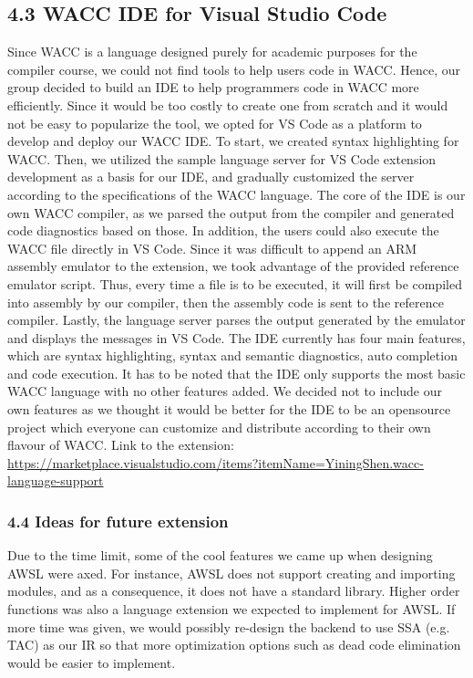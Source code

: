 \documentclass[10pt,a4paper]{report}
\begin{document}
  \subsection*{4.3 WACC IDE for Visual Studio Code}
  Since WACC is a language designed purely for academic purposes for the compiler course, we could not find tools to help users code in WACC. Hence, 
  our group decided to build an IDE to help programmers code in WACC more efficiently. Since it would be too costly to create one from scratch and 
  it would not be easy to popularize the tool, we opted for VS Code as a platform to develop and deploy our WACC IDE. To start, we created syntax 
  highlighting for WACC. Then, we utilized the sample language server for VS Code extension development as a basis for our IDE, and gradually customized 
  the server according to the specifications of the WACC language. The core of the IDE is our own WACC compiler, as we parsed the output from the compiler 
  and generated code diagnostics based on those. In addition, the users could also execute the WACC file directly in VS Code. Since it was difficult to 
  append an ARM assembly emulator to the extension, we took advantage of the provided reference emulator script. Thus, every time a file is to be executed, 
  it will first be compiled into assembly by our compiler, then the assembly code is sent to the reference compiler. Lastly, the language server parses the 
  output generated by the emulator and displays the messages in VS Code. The IDE currently has four main features, which are syntax highlighting, syntax 
  and semantic diagnostics, auto completion and code execution. It has to be noted that the IDE only supports the most basic WACC language with no other 
  features added. We decided not to include our own features as we thought it would be better for the IDE to be an opensource project which everyone can 
  customize and distribute according to their own flavour of WACC. Link to the extension: 
  \url{https://marketplace.visualstudio.com/items?itemName=YiningShen.wacc-language-support}

  \subsubsection*{4.4 Ideas for future extension}
  Due to the time limit, some of the cool features we came up when designing
  AWSL were axed. For instance, AWSL does not support creating and importing
  modules, and as a consequence, it does not have a standard library. Higher
  order functions was also a language extension we expected to implement for
  AWSL. If more time was given, we would possibly re-design the backend to use
  SSA (e.g. TAC) as our IR so that more optimization options such as dead code
  elimination would be easier to implement.
\end{document}
